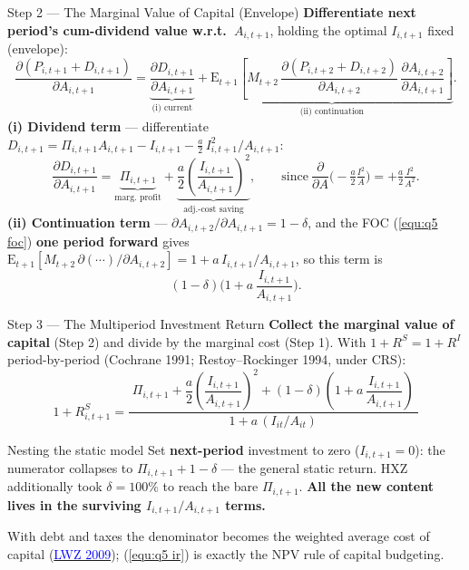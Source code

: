 \documentclass{beamer}
\begin{document}
\begin{frame}{Step 2 --- The Marginal Value of Capital (Envelope)}
	\textbf{Differentiate next period's cum-dividend value w.r.t.\ $A_{i,t+1}$}, holding the optimal $I_{i,t+1}$ fixed (envelope):
	\[
		\frac{\partial(P_{i,t+1}+D_{i,t+1})}{\partial A_{i,t+1}}=\underbrace{\frac{\partial D_{i,t+1}}{\partial A_{i,t+1}}}_{\text{(i) current}}+\underbrace{\mathrm{E}_{t+1}\!\left[M_{t+2}\,\frac{\partial(P_{i,t+2}+D_{i,t+2})}{\partial A_{i,t+2}}\,\frac{\partial A_{i,t+2}}{\partial A_{i,t+1}}\right]}_{\text{(ii) continuation}}.
	\]
	\textbf{(i) Dividend term} --- differentiate $D_{i,t+1}=\Pi_{i,t+1}A_{i,t+1}-I_{i,t+1}-\frac{a}{2}\,I_{i,t+1}^2/A_{i,t+1}$:
	\[
		\frac{\partial D_{i,t+1}}{\partial A_{i,t+1}}=\underbrace{\Pi_{i,t+1}}_{\text{marg.\ profit}}+\underbrace{\frac{a}{2}\!\left(\frac{I_{i,t+1}}{A_{i,t+1}}\right)^{2}}_{\text{adj.-cost saving}},
		\qquad\text{since}\ \frac{\partial}{\partial A}\!\Big(\!-\tfrac{a}{2}\tfrac{I^2}{A}\Big)=+\tfrac{a}{2}\tfrac{I^2}{A^2}.
	\]
	\textbf{(ii) Continuation term} --- $\partial A_{i,t+2}/\partial A_{i,t+1}=1-\delta$, and the FOC (\ref{equ:q5 foc}) \textbf{one period forward} gives $\mathrm{E}_{t+1}[M_{t+2}\,\partial(\cdots)/\partial A_{i,t+2}]=1+a\,I_{i,t+1}/A_{i,t+1}$, so this term is
	\[
		(1-\delta)\Big(1+a\,\frac{I_{i,t+1}}{A_{i,t+1}}\Big).
	\]
\end{frame}

\begin{frame}{Step 3 --- The Multiperiod Investment Return}
	\textbf{Collect the marginal value of capital} (Step 2) and divide by the marginal cost (Step 1). With $1+R^S=1+R^I$ period-by-period (Cochrane 1991; Restoy--Rockinger 1994, under CRS):
	\begin{equation}\label{equ:q5 ir}
		\boxed{\;
		1+R^S_{i,t+1}=\frac{\;\Pi_{i,t+1}+\dfrac{a}{2}\!\left(\dfrac{I_{i,t+1}}{A_{i,t+1}}\right)^{2}+(1-\delta)\!\left(1+a\,\dfrac{I_{i,t+1}}{A_{i,t+1}}\right)\;}{1+a\,(I_{it}/A_{it})}\;}
	\end{equation}
	\begin{block}{Nesting the static model}
		Set \textbf{next-period} investment to zero ($I_{i,t+1}=0$): the numerator collapses to $\Pi_{i,t+1}+1-\delta$ --- the general static return. HXZ additionally took $\delta=100\%$ to reach the bare $\Pi_{i,t+1}$. \textbf{All the new content lives in the surviving $I_{i,t+1}/A_{i,t+1}$ terms.}
	\end{block}
	{\footnotesize With debt and taxes the denominator becomes the weighted average cost of capital (\href{https://doi.org/10.1086/649760}{\textcolor{blue}{LWZ 2009}}); (\ref{equ:q5 ir}) is exactly the NPV rule of capital budgeting.}
\end{frame}
\end{document}
